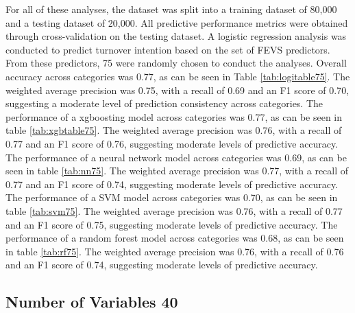 \documentclass[
  man]{apa7}
\begin{document}
For all of these analyses, the dataset was split into a training dataset of 80,000 and a testing dataset of 20,000. All predictive performance metrics were obtained through cross-validation on the testing dataset. A logistic regression analysis was conducted to predict turnover intention based on the set of FEVS predictors. From these predictors, 75 were randomly chosen to conduct the analyses. Overall accuracy across categories was 0.77, as can be seen in Table \ref{tab:logitable75}. The weighted average precision was 0.75, with a recall of 0.69 and an F1 score of 0.70, suggesting a moderate level of prediction consistency across categories.
The performance of a xgboosting model across categories was 0.77, as can be seen in table \ref{tab:xgbtable75}. The weighted average precision was 0.76, with a recall of 0.77 and an F1 score of 0.76, suggesting moderate levels of predictive accuracy.
The performance of a neural network model across categories was 0.69, as can be seen in table \ref{tab:nn75}. The weighted average precision was 0.77, with a recall of 0.77 and an F1 score of 0.74, suggesting moderate levels of predictive accuracy.
The performance of a SVM model across categories was 0.70, as can be seen in table \ref{tab:svm75}. The weighted average precision was 0.76, with a recall of 0.77 and an F1 score of 0.75, suggesting moderate levels of predictive accuracy.
The performance of a random forest model across categories was 0.68, as can be seen in table \ref{tab:rf75}. The weighted average precision was 0.76, with a recall of 0.76 and an F1 score of 0.74, suggesting moderate levels of predictive accuracy.

\hypertarget{number-of-variables-40}{%
\subsection{Number of Variables 40}\label{number-of-variables-40}}
\end{document}
